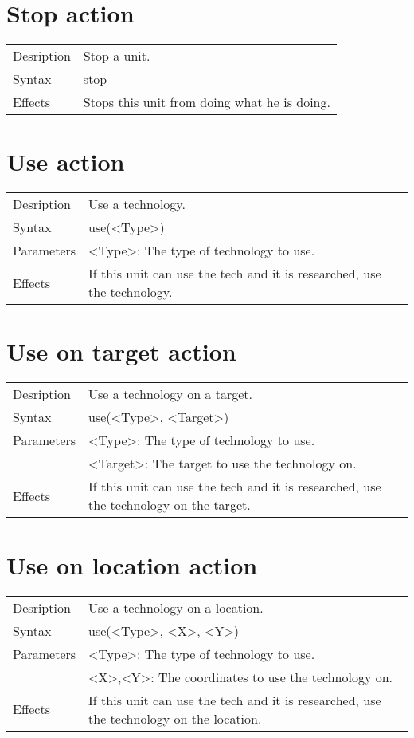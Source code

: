 \documentclass[english,11pt]{report}
\begin{document}
\section{Stop action}
\begin{tabularx}{\textwidth}{lX}
 Desription & Stop a unit. \\
 Syntax & stop \\
 Effects &  Stops this unit from doing what he is doing.
\end{tabularx}

\section{Use action}
\begin{tabularx}{\textwidth}{lX}
 Desription & Use a technology. \\
 Syntax & use(<Type>) \\
 Parameters & <Type>: The type of technology to use.\\
 Effects &  If this unit can use the tech and it is researched, use the technology.
\end{tabularx}

\section{Use on target action}
\begin{tabularx}{\textwidth}{lX}
 Desription & Use a technology on a target. \\
 Syntax & use(<Type>, <Target>) \\
 Parameters & <Type>: The type of technology to use.\\
            & <Target>: The target to use the technology on.\\
 Effects &  If this unit can use the tech and it is researched, use the technology on the target.
\end{tabularx}

\section{Use on location action}
\begin{tabularx}{\textwidth}{lX}
 Desription & Use a technology on a location. \\
 Syntax & use(<Type>, <X>, <Y>) \\
 Parameters & <Type>: The type of technology to use.\\
            & <X>,<Y>: The coordinates to use the technology on.\\
 Effects &  If this unit can use the tech and it is researched, use the technology on the location.
\end{tabularx}
\end{document}
